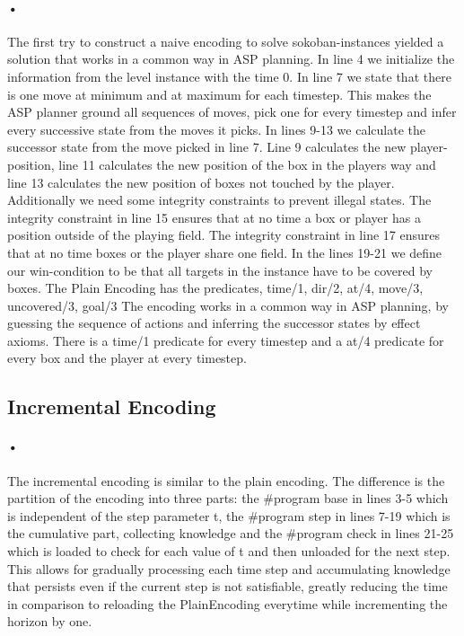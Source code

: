 \documentclass{report}
\begin{document}
\paragraph*{•}

The first try to construct a naive encoding to solve sokoban-instances yielded a solution that works in a common way in ASP planning. In line 4 we initialize the information from the level instance with the time 0. In line 7 we state that there is one move at minimum and at maximum for each timestep. This makes the ASP planner ground all sequences of moves, pick one for every timestep and infer every successive state from the moves it picks. In lines 9-13 we calculate the successor state from the move picked in line 7. Line 9 calculates the new player-position, line 11 calculates the new position of the box in the players way and line 13 calculates the new position of boxes not touched by the player. Additionally we need some integrity constraints to prevent illegal states. The integrity constraint in line 15 ensures that at no time a box or player has a position outside of the playing field. The integrity constraint in line 17 ensures that at no time boxes or the player share one field.
In the lines 19-21 we define our win-condition to be that all targets in the instance have to be covered by boxes.
The Plain Encoding has the predicates, time/1, dir/2, at/4, move/3, uncovered/3, goal/3
The encoding works in a common way in ASP planning, by guessing the sequence of actions and inferring the successor states by effect axioms. There is a time/1 predicate for every timestep and a at/4 predicate for every box and the player at every timestep.

\subsection{Incremental Encoding}
\paragraph*{•}

The incremental encoding is similar to the plain encoding. The difference is the partition of the encoding into three parts: the \#program base in lines 3-5 which is independent of the step parameter t, the \#program step in lines 7-19 which is the cumulative part, collecting knowledge and the \#program check in lines 21-25 which is loaded to check for each value of t and then unloaded for the next step. This allows for gradually processing each time step and accumulating knowledge that persists even if the current step is not satisfiable, greatly reducing the time in comparison to reloading the PlainEncoding everytime while incrementing the horizon by one.
\end{document}
